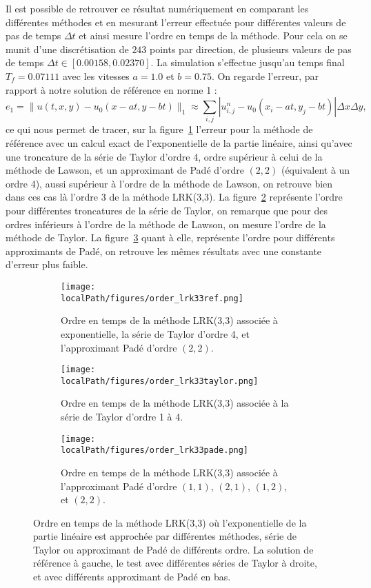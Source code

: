 Il est possible de retrouver ce résultat numériquement en comparant les différentes méthodes et en mesurant l'erreur effectuée pour différentes valeurs de pas de temps $\Delta t$ et ainsi mesure l'ordre en temps de la méthode. Pour cela on se munit d'une discrétisation de $243$ points par direction, de plusieurs valeurs de pas de temps $\Delta t\in[0.00158,0.02370]$. La simulation s'effectue jusqu'au temps final $T_f=0.07111$ avec les vitesses $a=1.0$ et $b=0.75$. On regarde l'erreur, par rapport à notre solution de référence en norme 1 :
$$
  e_1 = \| u(t,x,y) - u_0(x-at,y-bt) \|_1 \approx \sum_{i,j}|u^n_{i,j}-u_0(x_i-at,y_j-bt)|\Delta x\Delta y,
$$
ce qui nous permet de tracer, sur la figure~\ref{fig:lrk33ref} l'erreur pour la méthode de référence avec un calcul exact de l'exponentielle de la partie linéaire, ainsi qu'avec une troncature de la série de Taylor d'ordre 4, ordre supérieur à celui de la méthode de Lawson, et un approximant de Padé d'ordre $(2,2)$ (équivalent à un ordre 4), aussi supérieur à l'ordre de la méthode de Lawson, on retrouve bien dans ces cas là l'ordre 3 de la méthode LRK(3,3). La figure~\ref{fig:lrk33taylor} représente l'ordre pour différentes troncatures de la série de Taylor, on remarque que pour des ordres inférieurs à l'ordre de la méthode de Lawson, on mesure l'ordre de la méthode de Taylor. La figure~\ref{fig:lrk33pade} quant à elle, représente l'ordre pour différents approximants de Padé, on retrouve les mêmes résultats avec une constante d'erreur plus faible.

\begin{figure}
  \centering
  \begin{subfigure}{.45\textwidth}
    \centering
    \texttt{[image: \\localPath/figures/order\_lrk33ref.png]}
    \caption{Ordre en temps de la méthode LRK(3,3) associée à exponentielle, la série de Taylor d'ordre 4, et l'approximant Padé d'ordre $(2,2)$.}
    \label{fig:lrk33ref}
  \end{subfigure}
  \begin{subfigure}{.45\textwidth}
    \centering
    \texttt{[image: \\localPath/figures/order\_lrk33taylor.png]}
    \caption{Ordre en temps de la méthode LRK(3,3) associée à la série de Taylor d'ordre 1 à 4.\\ }
    \label{fig:lrk33taylor}
  \end{subfigure}
  \begin{subfigure}{.45\textwidth}
    \centering
    \texttt{[image: \\localPath/figures/order\_lrk33pade.png]}
    \caption{Ordre en temps de la méthode LRK(3,3) associée à l'approximant Padé d'ordre $(1,1)$, $(2,1)$, $(1,2)$, et $(2,2)$.}
    \label{fig:lrk33pade}
  \end{subfigure}
  \caption{Ordre en temps de la méthode LRK(3,3) où l'exponentielle de la partie linéaire est approchée par différentes méthodes, série de Taylor ou approximant de Padé de différents ordre. La solution de référence à gauche, le test avec différentes séries de Taylor à droite, et avec différents approximant de Padé en bas.}
  \label{fig:3:order}
\end{figure}
